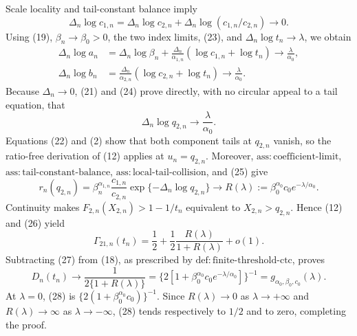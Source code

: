 Scale locality and tail-constant balance imply
\[
\Delta_n\log c_{1,n}
=\Delta_n\log c_{2,n}+\Delta_n\log(c_{1,n}/c_{2,n})\to0.
\tag{23}
\]
Using (19), \(\beta_n\to\beta_0>0\), the two index limits, (23), and \(\Delta_n\log t_n\to\lambda\), we obtain
\[
\begin{split}
\Delta_n\log a_n
&=\Delta_n\log\beta_n
 +\frac{\Delta_n}{\alpha_{1,n}}(\log c_{1,n}+\log t_n)
\longrightarrow\frac{\lambda}{\alpha_0},\\
\Delta_n\log b_n
&=\frac{\Delta_n}{\alpha_{2,n}}(\log c_{2,n}+\log t_n)
\longrightarrow\frac{\lambda}{\alpha_0}.
\end{split}
\tag{24}
\]
Because \(\Delta_n\to0\), (21) and (24) prove directly, with no circular appeal to a tail equation, that
\[
\Delta_n\log q_{2,n}\longrightarrow\frac{\lambda}{\alpha_0}.
\tag{25}
\]
Equations (22) and (2) show that both component tails at \(q_{2,n}\) vanish, so the ratio-free derivation of (12) applies at \(u_n=q_{2,n}\).  Moreover, \(\mathrm{ass{:}coefficient\text{-}limit}\), \(\mathrm{ass{:}tail\text{-}constant\text{-}balance}\), \(\mathrm{ass{:}local\text{-}tail\text{-}collision}\), and (25) give
\[
r_n(q_{2,n})
=\beta_n^{\alpha_{1,n}}\frac{c_{1,n}}{c_{2,n}}
  \exp\{-\Delta_n\log q_{2,n}\}
\longrightarrow R(\lambda)
:=\beta_0^{\alpha_0}c_0e^{-\lambda/\alpha_0}.
\tag{26}
\]
Continuity makes \(F_{2,n}(X_{2,n})>1-1/t_n\) equivalent to \(X_{2,n}>q_{2,n}\).  Hence (12) and (26) yield
\[
\Gamma_{21,n}(t_n)
=\frac12+\frac12\frac{R(\lambda)}{1+R(\lambda)}+o(1).
\tag{27}
\]
Subtracting (27) from (18), as prescribed by \(\mathrm{def{:}finite\text{-}threshold\text{-}ctc}\), proves
\[
D_n(t_n)\longrightarrow
\frac1{2\{1+R(\lambda)\}}
=\{2[1+\beta_0^{\alpha_0}c_0e^{-\lambda/\alpha_0}]\}^{-1}
=g_{\alpha_0,\beta_0,c_0}(\lambda).
\tag{28}
\]
At \(\lambda=0\), (28) is \(\{2(1+\beta_0^{\alpha_0}c_0)\}^{-1}\).  Since \(R(\lambda)\to0\) as \(\lambda\to+\infty\) and \(R(\lambda)\to\infty\) as \(\lambda\to-\infty\), (28) tends respectively to \(1/2\) and to zero, completing the proof.